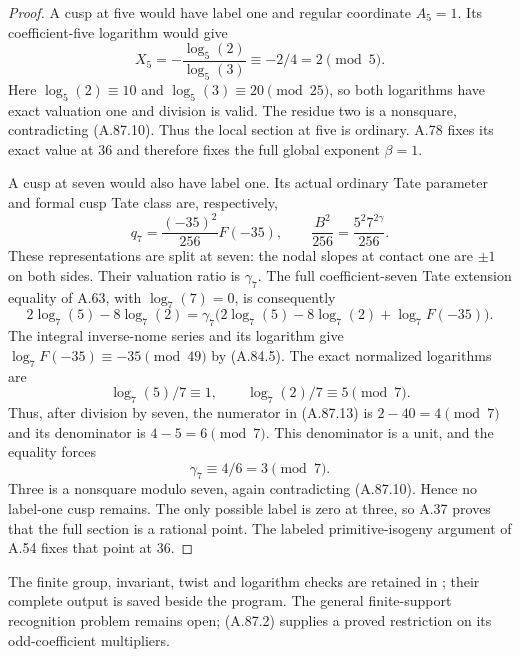\begin{proof}
A cusp at five would have label one and regular
coordinate $A_5=1$.  Its coefficient-five logarithm
would give
\[
          X_5=-\frac{\log_5(2)}{\log_5(3)}
                      \equiv-2/4=2\pmod5.
\tag{A.87.11}
\]
Here $\log_5(2)\equiv10$ and
$\log_5(3)\equiv20\pmod{25}$, so both logarithms
have exact valuation one and division is valid.
The residue two is a nonsquare, contradicting
(A.87.10).  Thus the local section at five is
ordinary.  A.78 fixes its exact value at $36$ and
therefore fixes the full global exponent $\beta=1$.

A cusp at seven would also have label one.
Its actual ordinary Tate parameter and formal cusp
Tate class are, respectively,
\[
 q_7=\frac{(-35)^2}{256}F(-35),\qquad
          \frac{B^2}{256}
                  =\frac{5^2 7^{2\gamma}}{256}.
\tag{A.87.12}
\]
These representations are split at seven: the nodal
slopes at contact one are $\pm1$ on both sides.
Their valuation ratio is $\gamma_7$.
The full coefficient-seven Tate extension equality
of A.63, with $\log_7(7)=0$, is consequently
\[
 2\log_7(5)-8\log_7(2)
     =\gamma_7\bigl(2\log_7(5)-8\log_7(2)
                                  +\log_7 F(-35)\bigr).
\tag{A.87.13}
\]
The integral inverse-nome series and its logarithm
give $\log_7 F(-35)\equiv-35\pmod{49}$ by
(A.84.5).  The exact normalized logarithms are
\[
       \log_7(5)/7\equiv1,
                   \qquad \log_7(2)/7\equiv5\pmod7.
\tag{A.87.14}
\]
Thus, after division by seven, the numerator in
(A.87.13) is $2-40=4\pmod7$ and its denominator
is $4-5=6\pmod7$.  This denominator is a unit,
and the equality forces
\[
                         \gamma_7\equiv4/6=3\pmod7.
\tag{A.87.15}
\]
Three is a nonsquare modulo seven, again contradicting
(A.87.10).  Hence no label-one cusp remains.
The only possible label is zero at three, so A.37
proves that the full section is a rational point.
The labeled primitive-isogeny argument of A.54 fixes
that point at $36$.
\end{proof}

The finite group, invariant, twist and logarithm checks
are retained in
;
their complete output is saved beside the program.
The general finite-support recognition problem remains
open; (A.87.2) supplies a proved restriction on its
odd-coefficient multipliers.
